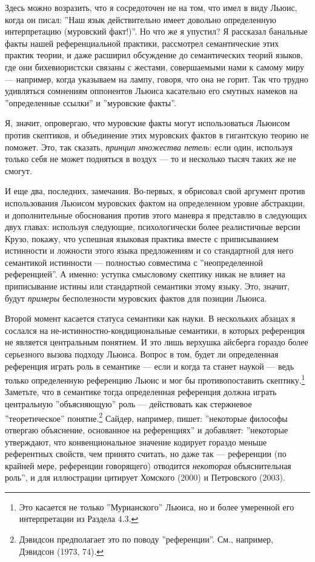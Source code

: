 \documentclass[11pt]{book}
\begin{document}
Здесь можно возразить, что я сосредоточен не на том, что имел в виду Льюис, когда он писал: ''Наш язык действительно имеет довольно определенную интерпретацию (муровский факт!)''. Но что же я упустил? Я рассказал банальные факты нашей референциальной практики, рассмотрел семантические этих практик теории, и даже расширил обсуждение до семантических теорий языков, где они бихевиористски связаны с жестами, совершаемыми нами к самому миру --- например, когда указываем на лампу, говоря, что она не горит. Так что трудно удивляться сомнениям оппонентов Льюиса касательно его смутных намеков на ''определенные ссылки'' и ''муровские факты''.

Я, значит, опровергаю, что муровские факты могут использоваться Льюисом против скептиков, и объединение этих муровских фактов в гигантскую теорию не поможет. Это, так сказать, \textit{принцип множества петель}: если один, используя только себя не может подняться в воздух --- то и несколько тысяч таких же не смогут.

И еще два, последних, замечания. Во-первых, я обрисовал свой аргумент против использования Льюисом муровских фактом на определенном уровне абстракции, и дополнительные обоснования против этого маневра я представлю в следующих двух главах: используя следующие, психологически более реалистичные версии Крузо, покажу, что успешная языковая практика вместе с приписыванием истинности и ложности этого языка предложениям и со стандартной для него семантикой истинности --- полностью совместима с ''неопределенной референцией''. А именно: уступка смысловому скептику никак не влияет на приписывание истины или стандартной семантики этому языку. Это, значит, будут \textit{примеры} бесполезности муровских фактов для позиции Льюиса.

Второй момент касается статуса семантики как науки. В нескольких абзацах я сослался на не-истинностно-кондициональные семантики, в которых референция не является центральным понятием. И это лишь верхушка айсберга гораздо более серьезного вызова подходу Льюиса. Вопрос в том, будет ли определенная референция играть роль в семантике --- если и когда та станет наукой --- ведь только определенную референцию Льюис и мог бы противопоставить скептику.\footnote{Это касается не только ''Мурианского'' Льюиса, но и более умеренной его интерпретации из Раздела 4.3.} Заметьте, что в семантике тогда определенная референция должна играть центральную ''объясняющую'' роль --- действовать как стержневое ''теоретическое'' понятие.\footnote{Дэвидсон предполагает это по поводу ''референции''. См., например, Дэвидсон (1973, 74).} Сайдер, например, пишет: ''некоторые философы отвергаю объяснение, основанное на референциях'' и добавляет: ''некоторые утверждают, что конвенциональное значение кодирует гораздо меньше референтных свойств, чем принято считать, но даже так --- референции (по крайней мере, референции говорящего) отводится \textit{некоторая} объяснительная роль'', и для иллюстрации цитирует Хомского (2000) и Петровского (2003).
\end{document}
